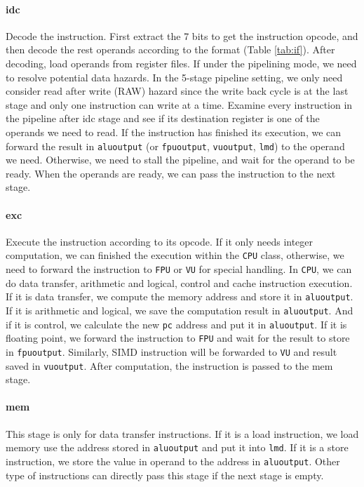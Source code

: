 \documentclass{sig-alternate}
\begin{document}
\paragraph{idc}
Decode the instruction. First extract the 7 bits to get the instruction opcode, and then decode the rest operands according to the format (Table \ref{tab:if}). After decoding, load operands from register files. If under the pipelining mode, we need to resolve potential data hazards. In the 5-stage pipeline setting, we only need consider read after write (RAW) hazard since the write back cycle is at the last stage and only one instruction can write at a time. Examine every instruction in the pipeline after idc stage and see if its destination register is one of the operands we need to read. If the instruction has finished its execution, we can forward the result in \texttt{aluoutput} (or \texttt{fpuoutput}, \texttt{vuoutput}, \texttt{lmd}) to the operand we need. Otherwise, we need to stall the pipeline, and wait for the operand to be ready. When the operands are ready, we can pass the instruction to the next stage.

\paragraph{exc}
Execute the instruction according to its opcode. If it only needs integer computation, we can finished the execution within the \texttt{CPU} class, otherwise, we need to forward the instruction to \texttt{FPU} or \texttt{VU} for special handling. In \texttt{CPU}, we can do data transfer, arithmetic and logical, control and cache instruction execution. If it is data transfer, we compute the memory address and store it in \texttt{aluoutput}. If it is arithmetic and logical, we save the computation result in \texttt{aluoutput}. And if it is control, we calculate the new \texttt{pc} address and put it in \texttt{aluoutput}. If it is floating point, we forward the instruction to \texttt{FPU} and wait for the result to store in \texttt{fpuoutput}. Similarly, SIMD instruction will be forwarded to \texttt{VU} and result saved in \texttt{vuoutput}. After computation, the instruction is passed to the mem stage.

\paragraph{mem}
This stage is only for data transfer instructions. If it is a load instruction, we load memory use the address stored in \texttt{aluoutput} and put it into \texttt{lmd}. If it is a store instruction, we store the value in operand to the address in \texttt{aluoutput}. Other type of instructions can directly pass this stage if the next stage is empty.
\end{document}
